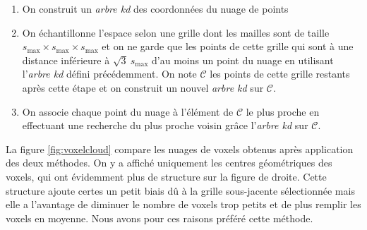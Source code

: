 \documentclass[a4paper, onecolumn, 11pt]{article}
\begin{document}
\begin{enumerate}
\item On construit un \emph{arbre kd} des coordonnées du nuage de points
\item On échantillonne l'espace selon une grille dont les mailles sont de taille $s_\text{max} \times s_\text{max}\times s_\text{max}$ et on ne garde que les points de cette grille qui sont à une distance inférieure à $\sqrt{3}\ s_\text{max}$ d'au moins un point du nuage en utilisant l'\emph{arbre kd} défini précédemment. On note $\mathcal{C}$ les points de cette grille restants après cette étape et on construit un nouvel \emph{arbre kd} sur $\mathcal{C}$.
\item On associe chaque point du nuage à l'élément de $\mathcal{C}$ le plus proche en effectuant une recherche du plus proche voisin grâce l'\emph{arbre kd} sur $\mathcal{C}$.
\end{enumerate}

La figure \ref{fig:voxelcloud} compare les nuages de voxels obtenus après application des deux méthodes. On y a affiché uniquement les centres géométriques des voxels, qui ont évidemment plus de structure sur la figure de droite. Cette structure ajoute certes un petit biais dû à la grille sous-jacente sélectionnée mais elle a l'avantage de diminuer le nombre de voxels trop petits et de plus remplir les voxels en moyenne. Nous avons pour ces raisons préféré cette méthode. 
\end{document}
